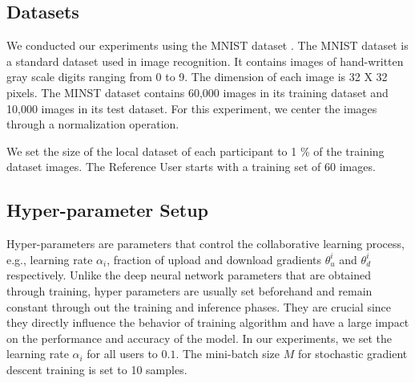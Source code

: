 \documentclass[conference]{IEEEtran}
\begin{document}



\subsection{Datasets}
We conducted our experiments using the MNIST dataset \cite{deng2012mnist}. The MNIST dataset is a standard dataset used in image
recognition. It contains images of hand-written gray scale digits ranging from 0 to 9. The dimension of each image is 32 X 32 pixels.
The MINST dataset contains 60,000 images in its training dataset and 10,000 images in its test dataset.
For this experiment, we center the images through a normalization operation.  

We set the size of the local dataset of each participant to 1 \% of the training dataset images.  The Reference User starts with a
training set of 60 images.


\subsection{Hyper-parameter Setup}


Hyper-parameters are parameters that control the collaborative learning process, e.g., learning rate $\alpha_i$, fraction of upload and
download gradients $\theta^i_u$ and $\theta^i_d$ respectively. Unlike the deep neural network parameters that are obtained through
training, hyper parameters are usually set beforehand and remain constant through out the training and inference phases. They are
crucial since they directly influence the behavior of training algorithm and have a large impact on the performance and accuracy of the
model. In our experiments, we set the learning rate $\alpha_i$ for all users to $0.1$.  The mini-batch size $M$ for stochastic gradient
descent training is set to 10 samples.
\end{document}

